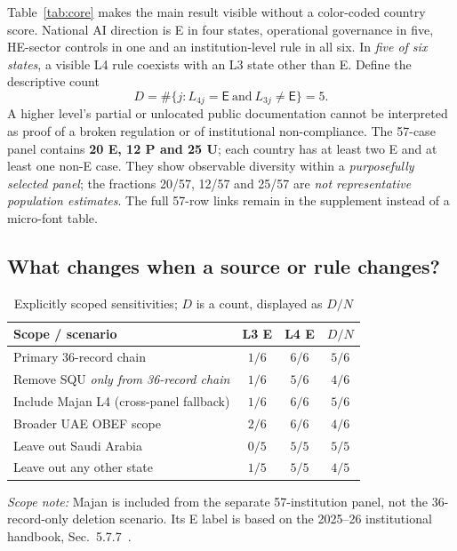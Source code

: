 \documentclass[conference,letterpaper]{IEEEtran}
\newcommand{\stE}{\textsf{E}}
\begin{document}
Table~\ref{tab:core} makes the main result visible without a color-coded country score. National AI direction is E in four states, operational governance in five, HE-sector controls in one and an institution-level rule in all six. In \emph{five of six states}, a visible L4 rule coexists with an L3 state other than E. Define the descriptive count
\begin{equation}\label{eq:d}
D=\#\{j:L_{4j}=\stE\ \text{and}\ L_{3j}\neq\stE\}=5.
\end{equation}
A higher level's partial or unlocated public documentation cannot be interpreted as proof of a broken regulation or of institutional non-compliance. The 57-case panel contains \textbf{20 E, 12 P and 25 U}; each country has at least two E and at least one non-E case. They show observable diversity within a \emph{purposefully selected panel}; the fractions 20/57, 12/57 and 25/57 are \emph{not representative population estimates}. The full 57-row links remain in the supplement instead of a micro-font table.

\subsection{What changes when a source or rule changes?}
\begin{table}[H]
\centering\caption{Explicitly scoped sensitivities; $D$ is a count, displayed as $D/N$}
\label{tab:sensitivity}\small
\setlength{\tabcolsep}{3pt}
\begin{tabularx}{\columnwidth}{@{}Xccc@{}}
\toprule
Scope / scenario & L3 E & L4 E & $D/N$\tabularnewline\midrule
Primary 36-record chain & $1/6$ & $6/6$ & $5/6$\tabularnewline
Remove SQU \emph{only from 36-record chain} & $1/6$ & $5/6$ & $4/6$\tabularnewline
Include Majan L4 (cross-panel fallback) & $1/6$ & $6/6$ & $5/6$\tabularnewline
Broader UAE OBEF scope & $2/6$ & $6/6$ & $4/6$\tabularnewline
Leave out Saudi Arabia & $0/5$ & $5/5$ & $5/5$\tabularnewline
Leave out any other state & $1/5$ & $5/5$ & $4/5$\tabularnewline\bottomrule
\end{tabularx}
\par\vspace{2pt}
\begin{minipage}{\columnwidth}
\footnotesize\noindent\emph{Scope note:} Majan is included from the separate 57-institution panel, not the 36-record-only deletion scenario. Its E label is based on the 2025--26 institutional handbook, Sec.~5.7.7~\cite{majanhb,majannews}.
\end{minipage}
\end{table}
\end{document}

